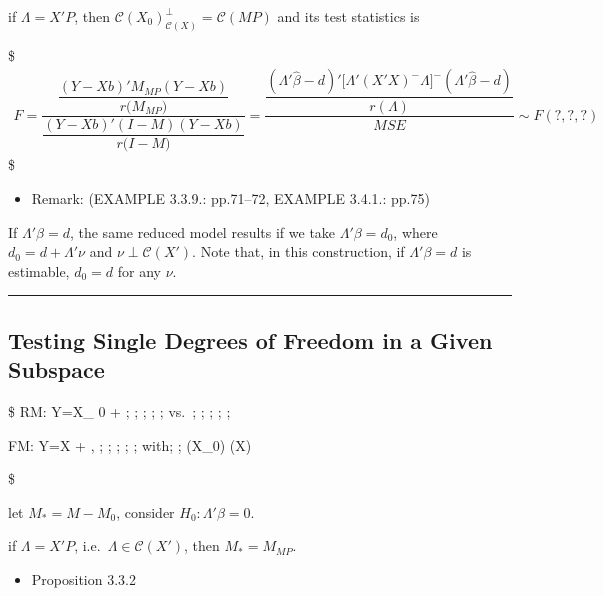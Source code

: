 \documentclass[
]{book}
\providecommand{\tightlist}{%
  \setlength{\itemsep}{0pt}\setlength{\parskip}{0pt}}
\begin{document}
{{{if \(\Lambda = X'P\), then \(\mathcal{C}(X_0)_{\mathcal{C}(X)}^\perp = \mathcal{C}(MP)\) and its test statistics is

\$
\begin{align}



F = \dfrac
{\dfrac{(Y-Xb)'M_{MP}(Y-Xb)}{r \Big(M_{MP} \Big)}}
{\dfrac{(Y-Xb)'(I-M)(Y-Xb)}{r \Big(I-M \Big)}}

= 






\dfrac
{\dfrac{(\Lambda ' \hat \beta - d)' \Big[ \Lambda'(X'X)^{-}\Lambda \Big]^- (\Lambda ' \hat \beta - d)}{r(\Lambda)}}
{MSE}


\sim F(?, ?, ?)

\end{align}
\$

\begin{itemize}
\tightlist
\item
  Remark: (EXAMPLE 3.3.9.: pp.71--72, EXAMPLE 3.4.1.: pp.75)
\end{itemize}

If \(\Lambda ' \beta = d\), the same reduced model results if we take \(\Lambda ' \beta = d_0\), where \(d_0 = d + \Lambda ' \nu\) and \(\nu \perp \mathcal{C}(X')\). Note that, in this construction, if \(\Lambda ' \beta = d\) is estimable, \(d_0 = d\) for any \(\nu\).

\begin{center}\rule{0.5\linewidth}{0.5pt}\end{center}

\hypertarget{testing-single-degrees-of-freedom-in-a-given-subspace}{%
\subsection{Testing Single Degrees of Freedom in a Given Subspace}\label{testing-single-degrees-of-freedom-in-a-given-subspace}}

\$
RM: Y=X\_ 0 \gamma + \epsilon  ; ; ; ; ; vs.~; ; ; ; ;

FM: Y=X \beta + \epsilon, ; ; ; ; ; with; ; (X\_0) \subset {}(X)

\$

let \(M_\ast = M - M_0\), consider \(H_0 : \Lambda ' \beta = 0\).

if \(\Lambda = X'P\), i.e.~\(\Lambda \in \mathcal{C}(X')\), then \(M_\ast = M_{MP}\).

\begin{itemize}
\tightlist
\item
  Proposition 3.3.2
\end{itemize}

}}}
\end{document}
